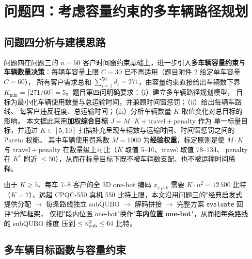 \documentclass[UTF8,12pt,a4paper]{ctexart}
\begin{document}
\section{问题四：考虑容量约束的多车辆路径规划}
\label{sec:q4}

\subsection{问题四分析与建模思路}
\label{subsec:q4-analysis}

问题四在问题三的 $n=50$ 客户时间窗约束基础上，进一步引入\textbf{多车辆容量约束}与
\textbf{车辆数量决策}：每辆车容量上限 $C=30$ 已不再适用（题目附件 2 给定单车容量 $C=60$），
所有客户需求总和 $\sum_{i=1}^{50}d_i=271$，由容量约束直接给出车辆数下界
$K_{\min}=\lceil 271/60\rceil=5$。题目第四问明确要求：（i）建立多车辆路径规划模型，
目标为最小化车辆使用数量与总运输时间，并兼顾时间窗惩罚；（ii）给出每辆车路线、
每客户违反程度、总运输时间；（iii）分析车辆数量 $K$ 取值变化对总目标的影响。
本文据此采用\textbf{加权综合目标 $J=M\!\cdot\!K+\mathrm{travel}+\mathrm{penalty}$} 作为
单一标量目标，并通过 $K\in[5,10]$ 扫描补充呈现车辆数与运输时间、时间窗惩罚之间的 Pareto 权衡。
其中车辆使用罚系数 $M=1000$ 为\textbf{经验权重}，标定原则是使 $M\!\cdot\!K$ 与
$\mathrm{travel}+\mathrm{penalty}$ 在数量级上可比（$K$ 取值 5--10、travel 取值 78--134、
penalty 在 $K^*$ 附近 $\le 50$），从而在标量目标下既不被车辆数支配、也不被运输时间稀释。

由于 $K\ge 5$、每车 7--8 客户的全 3D one-hot 编码 $x_{i,p,k}$ 需要 $K\!\cdot\!n^2=12\,500$
比特（$K=7$），远超 CPQC-550 真机 550 比特上限，本文沿用问题三的"经典启发式提供分配 $\to$
每条路线独立 subQUBO $\to$ 解码拼接 $\to$ 完整方案 \texttt{evaluate} 回评"分解框架，
仅把"段内位置 one-hot"换作"\textbf{车内位置 one-hot}"，从而把每条路线的 subQUBO 维度
压到 $\le n_{\rm sub}^2\le 64$ 比特。

\subsection{多车辆目标函数与容量约束}
\label{subsec:q4-model}
\end{document}
